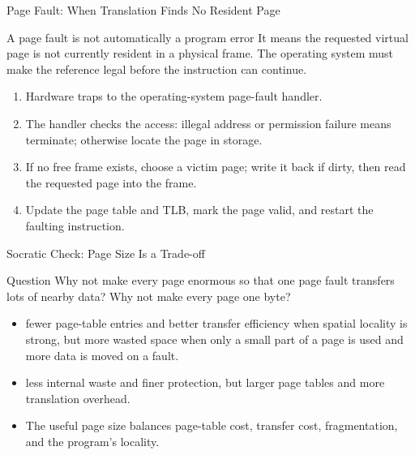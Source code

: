 \documentclass[aspectratio=169]{beamer}
\begin{document}
\begin{frame}{Page Fault: When Translation Finds No Resident Page}
  \begin{alertblock}{A page fault is not automatically a program error}
    It means the requested virtual page is not currently resident in a physical
    frame. The operating system must make the reference legal before the
    instruction can continue.
  \end{alertblock}
  \begin{enumerate}
    \item Hardware traps to the operating-system page-fault handler.
    \item The handler checks the access: illegal address or permission failure
      means terminate; otherwise locate the page in storage.
    \item If no free frame exists, choose a victim page; write it back if
      dirty, then read the requested page into the frame.
    \item Update the page table and TLB, mark the page valid, and restart the
      faulting instruction.
  \end{enumerate}
\end{frame}

\begin{frame}{Socratic Check: Page Size Is a Trade-off}
  \begin{alertblock}{Question}
    Why not make every page enormous so that one page fault transfers lots of
    nearby data? Why not make every page one byte?
  \end{alertblock}
  \begin{itemize}
    \item {} fewer page-table entries and better transfer
      efficiency when spatial locality is strong, but more wasted space when
      only a small part of a page is used and more data is moved on a fault.
    \item {} less internal waste and finer protection, but
      larger page tables and more translation overhead.
    \item The useful page size balances page-table cost, transfer cost,
      fragmentation, and the program's locality.
  \end{itemize}
\end{frame}
\end{document}
